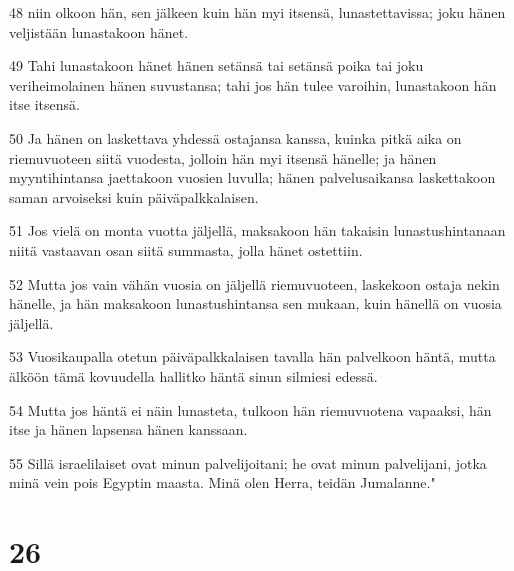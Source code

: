 \par 48 niin olkoon hän, sen jälkeen kuin hän myi itsensä, lunastettavissa; joku hänen veljistään lunastakoon hänet.
\par 49 Tahi lunastakoon hänet hänen setänsä tai setänsä poika tai joku veriheimolainen hänen suvustansa; tahi jos hän tulee varoihin, lunastakoon hän itse itsensä.
\par 50 Ja hänen on laskettava yhdessä ostajansa kanssa, kuinka pitkä aika on riemuvuoteen siitä vuodesta, jolloin hän myi itsensä hänelle; ja hänen myyntihintansa jaettakoon vuosien luvulla; hänen palvelusaikansa laskettakoon saman arvoiseksi kuin päiväpalkkalaisen.
\par 51 Jos vielä on monta vuotta jäljellä, maksakoon hän takaisin lunastushintanaan niitä vastaavan osan siitä summasta, jolla hänet ostettiin.
\par 52 Mutta jos vain vähän vuosia on jäljellä riemuvuoteen, laskekoon ostaja nekin hänelle, ja hän maksakoon lunastushintansa sen mukaan, kuin hänellä on vuosia jäljellä.
\par 53 Vuosikaupalla otetun päiväpalkkalaisen tavalla hän palvelkoon häntä, mutta älköön tämä kovuudella hallitko häntä sinun silmiesi edessä.
\par 54 Mutta jos häntä ei näin lunasteta, tulkoon hän riemuvuotena vapaaksi, hän itse ja hänen lapsensa hänen kanssaan.
\par 55 Sillä israelilaiset ovat minun palvelijoitani; he ovat minun palvelijani, jotka minä vein pois Egyptin maasta. Minä olen Herra, teidän Jumalanne."

\chapter{26}


